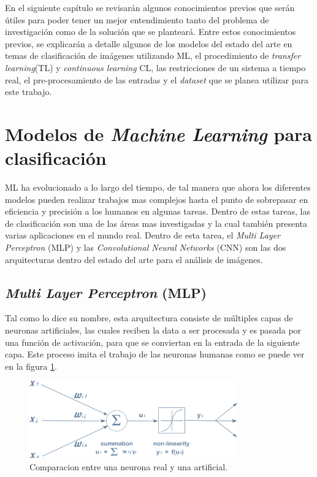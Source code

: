 En el siguiente capítulo se revisarán algunos conocimientos previos que serán útiles para poder tener un mejor entendimiento tanto del problema de investigación como de la solución que se planteará. Entre estos conocimientos previos, se explicarán a detalle algunos de los modelos del estado del arte en temas de clasificación de imágenes utilizando ML, el procedimiento de \textit{transfer learning}(TL) y \textit{continuous learning} CL, las restricciones de un sistema a tiempo real, el pre-procesamiento de las entradas y el \textit{dataset} que se planea utilizar para este trabajo.\\

\section{Modelos de \textit{Machine Learning} para clasificación}
ML ha evolucionado a lo largo del tiempo, de tal manera que ahora los diferentes modelos pueden realizar trabajos mas complejos hasta el punto de sobrepasar en eficiencia y precisión a los humanos en algunas tareas. Dentro de estas tareas, las de clasificación son una de las áreas mas investigadas y la cual también presenta varias aplicaciones en el mundo real. Dentro de esta tarea, el \textit{Multi Layer Perceptron} (MLP) y las \textit{Convolutional Neural Networks} (CNN) son las dos arquitecturas dentro del estado del arte para el análisis de imágenes.

\subsection{\textit{Multi Layer Perceptron} (MLP)}
Tal como lo dice su nombre, esta arquitectura consiste de múltiples capas de neuronas artificiales, las cuales reciben la data a ser procesada y es pasada por una función de activación, para que se conviertan en la entrada de la siguiente capa. Este proceso imita el trabajo de las neuronas humanas como se puede ver en la figura \ref{neurona}. \\

\begin{figure}[h!]
\includegraphics[width=0.8\textwidth]{images/comparacion_neuronas.jpg}
\centering
\caption{Comparacion entre una neurona real y una artificial\protect\cite{neuronas}.}
\label{neurona}
\end{figure}

